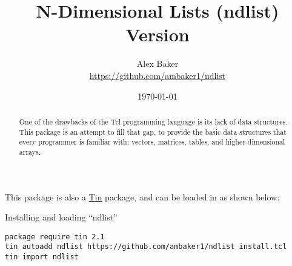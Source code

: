 \documentclass{article}
\title{\Huge{N-Dimensional Lists (ndlist)}\\\large Version \version}
\author{Alex Baker\\\small\url{https://github.com/ambaker1/ndlist}}
\date{\small\today}
\begin{document}
\maketitle
\begin{abstract}
One of the drawbacks of the Tcl programming language is its lack of data structures. This package is an attempt to fill that gap, to provide the basic data structures that every programmer is familiar with: vectors, matrices, tables, and higher-dimensional arrays.
\end{abstract}
\vspace{20 pt}

This package is also a \textcolor{blue}{\href{https://github.com/ambaker1/Tin}{Tin}} package, and can be loaded in as shown below:
\begin{example}{Installing and loading ``ndlist''}
\begin{lstlisting}
package require tin 2.1
tin autoadd ndlist https://github.com/ambaker1/ndlist install.tcl
tin import ndlist
\end{lstlisting}
\end{example}

\clearpage








\printindex
\end{document}
